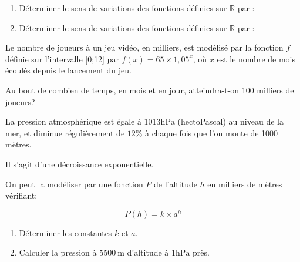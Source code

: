 \documentclass[french]{book}
\begin{document}
\begin{exocor}

\begin{enumerate}
\item Déterminer le sens de variations des fonctions définies sur $\mathbb{R}$ par :
\begin{enumerate}
\end{enumerate}

\item Déterminer le sens de variations des fonctions définies sur $\mathbb{R}$ par :
\begin{enumerate}
\end{enumerate}
\end{enumerate}
\end{exocor}

\begin{exocor}

Le nombre de joueurs à un jeu vidéo, en milliers, est modélisé par la fonction $f$ définie sur l'intervalle [0;12] par $f(x)=65 \times 1,05^{x}$, où $x$ est le nombre de mois écoulés depuis le lancement du jeu.

Au bout de combien de temps, en mois et en jour, atteindra-t-on 100 milliers de joueurs?

\end{exocor}

\begin{exocor}

La pression atmosphérique est égale à $1013 \mathrm{hPa}$ (hectoPascal) au niveau de la mer, et diminue régulièrement de $12 \%$ à chaque fois que l'on monte de 1000 mètres.

Il s'agit d'une décroissance exponentielle.

On peut la modéliser par une fonction $P$ de l'altitude $h$ en milliers de mètres vérifiant:

$$
P(h)=k \times a^{h}
$$

\begin{enumerate}
\item Déterminer les constantes $k$ et $a$.

\item Calculer la pression à $5500 \mathrm{~m}$ d'altitude à $1 \mathrm{hPa}$ près.
\end{enumerate}

\end{exocor}
\end{document}
